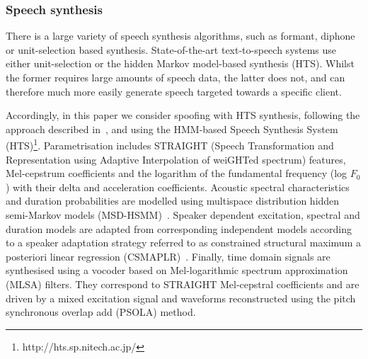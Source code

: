 \subsubsection{Speech synthesis}

There is a large variety of speech synthesis algorithms, such as formant, diphone or unit-selection based synthesis. State-of-the-art text-to-speech systems use either unit-selection or the hidden Markov model-based synthesis (HTS). Whilst the former requires large amounts of speech data, the latter does not, and can therefore much more easily generate speech targeted towards a specific client. 

Accordingly, in this paper we consider spoofing with HTS synthesis, following the approach described in~\cite{Yamagishi2009}, and using the HMM-based Speech Synthesis System (HTS)\footnote{http://hts.sp.nitech.ac.jp/}. Parametrisation includes STRAIGHT (Speech Transformation and Representation using Adaptive Interpolation of weiGHTed spectrum) features, Mel-cepstrum coefficients and the logarithm of the fundamental frequency (log $F_{0}$) with their delta and acceleration coefficients. Acoustic spectral characteristics and duration probabilities are modelled using multispace distribution hidden semi-Markov models (MSD-HSMM)~\cite{Russell1985}.  Speaker dependent  excitation, spectral and duration models are adapted from corresponding independent models according to a speaker adaptation strategy referred to as constrained structural maximum a posteriori linear regression (CSMAPLR)~\cite{Yamagishi2009a}.  Finally, time domain signals are synthesised using a vocoder based on Mel-logarithmic spectrum approximation (MLSA) filters.  They correspond to STRAIGHT Mel-cepstral coefficients and are driven by a mixed excitation signal and waveforms reconstructed using the pitch synchronous overlap add (PSOLA) method.


